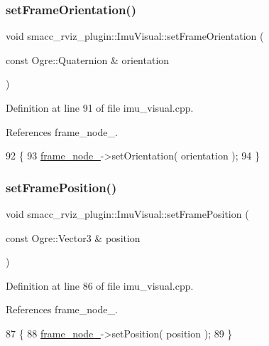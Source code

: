 \subsubsection{\texorpdfstring{set\+Frame\+Orientation()}{setFrameOrientation()}}
{\footnotesize\ttfamily void smacc\+\_\+rviz\+\_\+plugin\+::\+Imu\+Visual\+::set\+Frame\+Orientation (\begin{DoxyParamCaption}\item[{const Ogre\+::\+Quaternion \&}]{orientation }\end{DoxyParamCaption})}



Definition at line 91 of file imu\+\_\+visual.\+cpp.



References frame\+\_\+node\+\_\+.


\begin{DoxyCode}
92 \{
93   \hyperlink{classsmacc__rviz__plugin_1_1ImuVisual_ae41316c00ac89e1e0ee0adf62da10841}{frame\_node\_}->setOrientation( orientation );
94 \}
\end{DoxyCode}
\mbox{\label{classsmacc__rviz__plugin_1_1ImuVisual_a405f4e15692f2443f202bc55d989d669}} 
\subsubsection{\texorpdfstring{set\+Frame\+Position()}{setFramePosition()}}
{\footnotesize\ttfamily void smacc\+\_\+rviz\+\_\+plugin\+::\+Imu\+Visual\+::set\+Frame\+Position (\begin{DoxyParamCaption}\item[{const Ogre\+::\+Vector3 \&}]{position }\end{DoxyParamCaption})}



Definition at line 86 of file imu\+\_\+visual.\+cpp.



References frame\+\_\+node\+\_\+.


\begin{DoxyCode}
87 \{
88   \hyperlink{classsmacc__rviz__plugin_1_1ImuVisual_ae41316c00ac89e1e0ee0adf62da10841}{frame\_node\_}->setPosition( position );
89 \}
\end{DoxyCode}
\mbox{\label{classsmacc__rviz__plugin_1_1ImuVisual_a69589c7845b2e29e092460b1ee8a8275}} 
